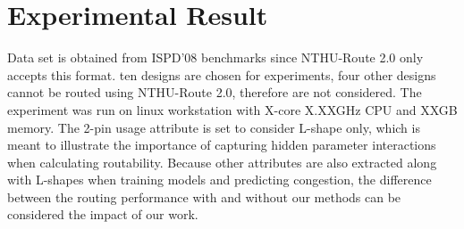 \section{Experimental Result}
\label{sec:result}
Data set is obtained from ISPD'08 benchmarks since NTHU-Route 2.0 only accepts this format. ten designs are chosen for experiments, four other designs cannot be routed using NTHU-Route 2.0, therefore are not considered. The experiment was run on linux workstation with X-core X.XXGHz CPU and XXGB memory. The 2-pin usage attribute is set to consider L-shape only, which is meant to illustrate the importance of capturing hidden parameter interactions when calculating routability. Because other attributes are also extracted along with L-shapes when training models and predicting congestion, the difference between the routing performance with and without our methods can be considered the impact of our work.

